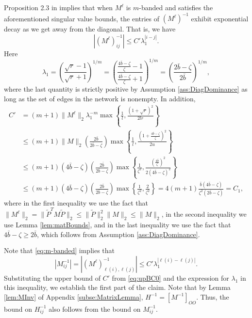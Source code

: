 \documentclass[opre,nonblindrev]{informs3} %
\begin{document}
\begin{APPENDIX}{}
Proposition 2.3 in \cite{demko1984decay} implies that
when $M^\ell$ is $m$-banded and satisfies the aforementioned singular value bounds, the entries of
$(M^\ell)^{-1}$  exhibit exponential decay as we get away from the diagonal. That is, we have
\begin{equation}\label{eq:m-banded}
|(M^{\ell})^{-1}_{ij}|
\leq C' \lambda_1^{|i-j|}.
\end{equation}
Here
\[
\lambda_1 =\left( \frac{\sqrt{r}-1}{\sqrt{r}+1}\right)^{1/m} = \left(\frac{\frac{4 \bar{b}  - \zeta}{\zeta} -1}{ \frac{4 \bar{b}  - \zeta}{\zeta}+1}\right)^{1/m} = \left(\frac{2 \bar{b}-\zeta}{2 \bar{b}}
\right)^{1/m},
\]
where the last quantity is strictly positive by Assumption \ref{ass:DiagDominance} as long as the set of edges in the network is nonempty.
In addition,
\begin{equation} \label{eq:upBC0}
\begin{aligned}
C'&= (m+1) \|M^\ell\|_2 \lambda_1^{-m} \max \left\{\frac{1}{l}, \frac{(1+\sqrt{r})^2}{2lr}\right\} \\
&\leq
(m+1) \|M\|_2
\left(\frac{2 \bar{b}}{2 \bar{b}-\zeta}
\right)
\max \left\{\frac{1}{l}, \frac{(1+\frac{4 \bar{b}  - \zeta}{\zeta})^2}{2u} \right\} \\
&\leq
(m+1) (4 \bar{b}  - \zeta)
\left(\frac{2 \bar{b}}{2 \bar{b}-\zeta}
\right) \max\left\{\frac{1}{\zeta^2}, \frac{(\frac{4 \bar{b}}{\zeta})^2}{2(4 \bar{b}  - \zeta)^2} \right\}\\
&		
\leq
(m+1) (4 \bar{b}  - \zeta)
\left(\frac{2 \bar{b}}{2 \bar{b}-\zeta}
\right) \max \left\{\frac{1}{\zeta^2}, \frac{2}{ \zeta^2} \right\}
=
4(m+1) \frac{ \bar{b}(4 \bar{b}  - \zeta)}{\zeta^2 (2 \bar{b}-\zeta)} =C_1	,
\end{aligned}
\end{equation}
where in the
first inequality we use the fact that $\|M^\ell \|_2 = \|\tilde{P}^T M \tilde{P}\|_2 \leq \|\tilde{P}\|_2^2 \|M\|_2 \leq \|M\|_2$,
in the second inequality we use Lemma \ref{lem:matBounds}, and in the last inequality we use the fact that $4\bar{b}-\zeta \geq 2\bar{b}$, which follows from Assumption \ref{ass:DiagDominance}.



Note that \eqref{eq:m-banded} implies that
\[
|M^{-1}_{ij}| = |(M^{\ell})^{-1}_{\ell(i),\ell(j)}|  \leq C' \lambda_1^{|\ell(i)-\ell(j)|}.
\]
Substituting the upper bound of $C'$ from \eqref{eq:upBC0} and the expression for $\lambda_1$ in
this inequality, we establish the first part of   the claim.
Note that by
Lemma \ref{lem:MInv} of Appendix \ref{subse:MatrixLemma},
$H^{-1} = [M^{-1}]_{OO}$.
Thus, the bound on $H^{-1}_{ij}$ also follows from the bound on $M^{-1}_{ij}$.
\hfill	\Halmos
\endproof    	




\end{APPENDIX}
\end{document}
